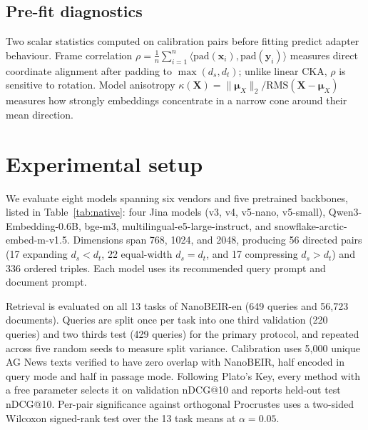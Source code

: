 \documentclass{article}
\begin{document}
\subsection{Pre-fit diagnostics}

Two scalar statistics computed on calibration pairs before fitting predict adapter behaviour. Frame correlation $\rho=\frac{1}{n}\sum_{i=1}^n\langle\mathrm{pad}(\mathbf{x}_i),\mathrm{pad}(\mathbf{y}_i)\rangle$ measures direct coordinate alignment after padding to $\max(d_s,d_t)$; unlike linear CKA, $\rho$ is sensitive to rotation. Model anisotropy $\kappa(\mathbf{X})=\lVert\boldsymbol{\mu}_X\rVert_2 / \mathrm{RMS}(\mathbf{X}-\boldsymbol{\mu}_X)$ measures how strongly embeddings concentrate in a narrow cone around their mean direction.

\section{Experimental setup}

\begin{table}[t]
\centering
\caption{Eight embedding models from six families evaluated on 13 NanoBEIR tasks. Anisotropy $\kappa$ is measured on the 5{,}000 calibration texts; native nDCG@10 is reported over all 649 queries and the 429 held-out test queries.}
\label{tab:native}

\end{table}

We evaluate eight models spanning six vendors and five pretrained backbones, listed in Table~\ref{tab:native}: four Jina models (v3, v4, v5-nano, v5-small), Qwen3-Embedding-0.6B, bge-m3, multilingual-e5-large-instruct, and snowflake-arctic-embed-m-v1.5. Dimensions span 768, 1024, and 2048, producing 56 directed pairs (17 expanding $d_s<d_t$, 22 equal-width $d_s=d_t$, and 17 compressing $d_s>d_t$) and 336 ordered triples. Each model uses its recommended query prompt and document prompt.

Retrieval is evaluated on all 13 tasks of NanoBEIR-en (649 queries and 56{,}723 documents). Queries are split once per task into one third validation (220 queries) and two thirds test (429 queries) for the primary protocol, and repeated across five random seeds to measure split variance. Calibration uses 5{,}000 unique AG News texts verified to have zero overlap with NanoBEIR, half encoded in query mode and half in passage mode. Following Plato's Key, every method with a free parameter selects it on validation nDCG@10 and reports held-out test nDCG@10. Per-pair significance against orthogonal Procrustes uses a two-sided Wilcoxon signed-rank test over the 13 task means at $\alpha=0.05$.
\end{document}
